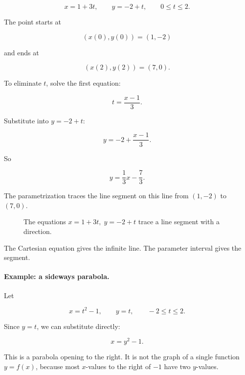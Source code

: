 \[
x=1+3t,
\qquad
y=-2+t,
\qquad
0\le t\le 2.
\]

The point starts at

\[
(x(0),y(0))=(1,-2)
\]

and ends at

\[
(x(2),y(2))=(7,0).
\]

To eliminate \(t\), solve the first equation:

\[
t=\frac{x-1}{3}.
\]

Substitute into \(y=-2+t\):

\[
y=-2+\frac{x-1}{3}.
\]

So

\[
y=\frac13x-\frac73.
\]

The parametrization traces the line segment on this line from \((1,-2)\) to \((7,0)\).

\begin{figure}[h]
\centering
{}
\caption{The equations \(x=1+3t,\;y=-2+t\) trace a line segment with a direction.}
\label{fig:parametric-line-segment}
\end{figure}

The Cartesian equation gives the infinite line.  The parameter interval gives the segment.

\paragraph{Example: a sideways parabola.}
Let

\[
x=t^2-1,
\qquad
y=t,
\qquad
-2\le t\le 2.
\]

Since \(y=t\), we can substitute directly:

\[
x=y^2-1.
\]

This is a parabola opening to the right.  It is not the graph of a single function
\(y=f(x)\), because most \(x\)-values to the right of \(-1\) have two \(y\)-values.

